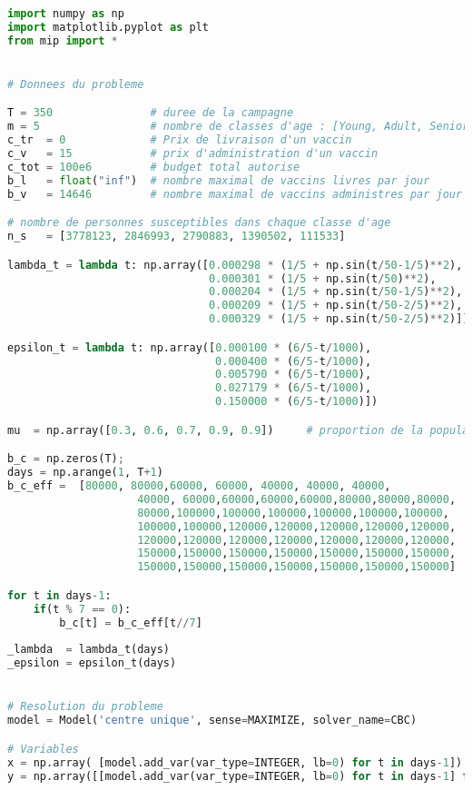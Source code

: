 \documentclass[a4paper,11pt]{report}
\begin{document}
\begin{lstlisting}[language=Python]
import numpy as np
import matplotlib.pyplot as plt
from mip import *


# Donnees du probleme

T = 350               # duree de la campagne
m = 5                 # nombre de classes d'age : [Young, Adult, Senior, Old, Centenarian]
c_tr  = 0             # Prix de livraison d'un vaccin
c_v   = 15            # prix d'administration d'un vaccin
c_tot = 100e6         # budget total autorise
b_l   = float("inf")  # nombre maximal de vaccins livres par jour
b_v   = 14646         # nombre maximal de vaccins administres par jour

# nombre de personnes susceptibles dans chaque classe d'age
n_s   = [3778123, 2846993, 2790883, 1390502, 111533]   

lambda_t = lambda t: np.array([0.000298 * (1/5 + np.sin(t/50-1/5)**2),
                               0.000301 * (1/5 + np.sin(t/50)**2),
                               0.000204 * (1/5 + np.sin(t/50-1/5)**2),
                               0.000209 * (1/5 + np.sin(t/50-2/5)**2),
                               0.000329 * (1/5 + np.sin(t/50-2/5)**2)])

epsilon_t = lambda t: np.array([0.000100 * (6/5-t/1000),
                                0.000400 * (6/5-t/1000), 
                                0.005790 * (6/5-t/1000), 
                                0.027179 * (6/5-t/1000),
                                0.150000 * (6/5-t/1000)])

mu  = np.array([0.3, 0.6, 0.7, 0.9, 0.9])     # proportion de la population disposee a se faire vacciner.

b_c = np.zeros(T);
days = np.arange(1, T+1)
b_c_eff =  [80000, 80000,60000, 60000, 40000, 40000, 40000,
				    40000, 60000,60000,60000,60000,80000,80000,80000,
				    80000,100000,100000,100000,100000,100000,100000,
				    100000,100000,120000,120000,120000,120000,120000,
				    120000,120000,120000,120000,120000,120000,120000,
				    150000,150000,150000,150000,150000,150000,150000,
				    150000,150000,150000,150000,150000,150000,150000]

for t in days-1:
    if(t % 7 == 0):
        b_c[t] = b_c_eff[t//7]
        
_lambda  = lambda_t(days)
_epsilon = epsilon_t(days)


# Resolution du probleme
model = Model('centre unique', sense=MAXIMIZE, solver_name=CBC)

# Variables
x = np.array( [model.add_var(var_type=INTEGER, lb=0) for t in days-1])
y = np.array([[model.add_var(var_type=INTEGER, lb=0) for t in days-1] for i in range(m)])


\end{lstlisting}
\end{document}

